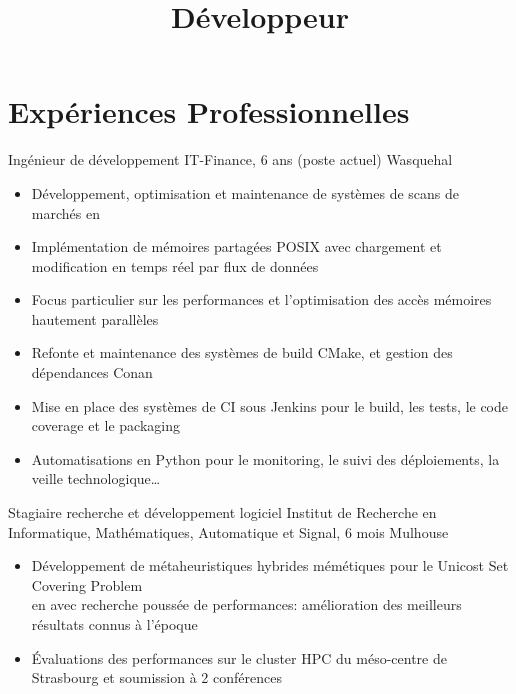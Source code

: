 \documentclass[a4paper,10pt,sans]{moderncv}
\title{Développeur \Cpp{}}
\begin{document}
    \maketitle


    \vspace*{0mm}
    \section{Expériences Professionnelles}
            {Ingénieur de développement }
            {IT-Finance, 6 ans (poste actuel)}
            {Wasquehal}
            {}
            {}
            \vspace{-5pt}
            \begin{itemize}
                \item Développement, optimisation et maintenance de systèmes de scans de marchés en \Cpp{}
                \item Implémentation de mémoires partagées POSIX avec chargement et modification en temps réel par flux de données
                \item Focus particulier sur les performances et l'optimisation des accès mémoires hautement parallèles
                \item Refonte et maintenance des systèmes de build CMake, et gestion des dépendances Conan
                \item Mise en place des systèmes de CI sous Jenkins pour le build, les tests, le code coverage et le packaging
                \item Automatisations en Python pour le monitoring, le suivi des déploiements, la veille technologique\ldots
            \end{itemize}
            \vspace{5pt}
            {Stagiaire recherche et développement logiciel }
            {Institut de Recherche en Informatique, Mathématiques, Automatique et Signal, 6 mois\hspace{-25pt}}
            {Mulhouse}
            {}
            {}
            \vspace{-5pt}
            \begin{itemize}
                \item Développement de métaheuristiques hybrides mémétiques pour le Unicost Set Covering Problem\\
                en \Cpp{} avec recherche poussée de performances: amélioration des meilleurs résultats connus à l'époque
                \item Évaluations des performances sur le cluster HPC du méso-centre de Strasbourg et soumission à 2 conférences \cite{Pinard2020}
            \end{itemize}
\end{document}
